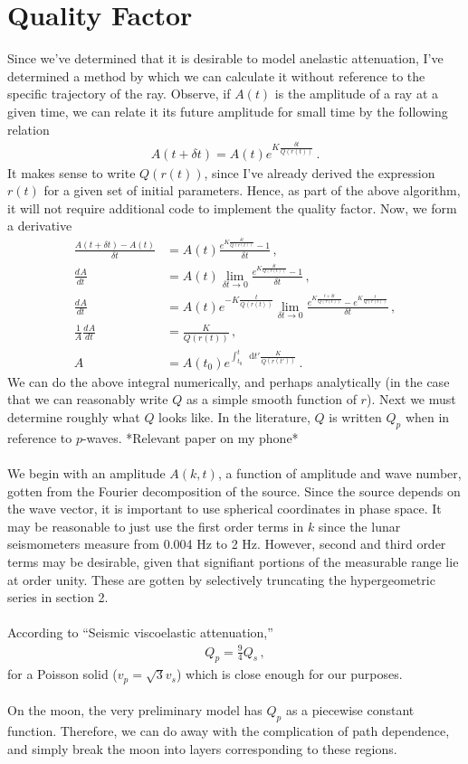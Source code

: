 \documentclass{article}
\newcommand*\diff{\mathop{}\!\mathrm{d}}
\newcommand*\f[2]{\frac{#1}{#2}}
\newcommand*\td[3]{\frac{d^{#3}#1}{d #2^{#3}}}
\begin{document}
\section{Quality Factor}
Since we've determined that it is desirable to model anelastic attenuation, I've determined a method by which we can calculate it without reference to the specific trajectory of the ray. Observe, if $A(t)$ is the amplitude of a ray at a given time, we can relate it its future amplitude for small time by the following relation
\begin{align}
A(t+\delta t) = A(t)e^{K\f{\delta t}{Q(r(t))}}\,.
\end{align}
It makes sense to write $Q(r(t))$, since I've already derived the expression $r(t)$ for a given set of initial parameters. Hence, as part of the above algorithm, it will not require additional code to implement the quality factor. Now, we form a derivative
\begin{align}
\f{A(t+\delta t)- A(t)}{\delta t} &= A(t)\f{e^{K\f{\delta t}{Q(r(t))}}-1}{\delta t}\,,\\
\td{A}{t}{}&= A(t)\lim_{\delta t\to 0}\f{e^{K\f{\delta t}{Q(r(t))}}-1}{\delta t}\,,\\
\td{A}{t}{}&= A(t)e^{-K\f{t}{Q(r(t))}}\lim_{\delta t\to 0}\f{e^{K\f{t +\delta t}{Q(r(t))}}-{e^{K\f{t}{Q(r(t))}}}}{\delta t}\,,\\
\f{1}{A}\td{A}{t}{}&= \f{K}{Q(r(t))}\,,\\
A &= A(t_0)e^{\int_{t_0}^t\diff t'\f{K}{Q(r(t'))}}\,.
\end{align}
We can do the above integral numerically, and perhaps analytically (in the case that we can reasonably write $Q$ as a simple smooth function of $r$). Next we must determine roughly what $Q$ looks like. In the literature, $Q$ is written $Q_p$ when in reference to $p$-waves. *Relevant paper on my phone*
\\\\
We begin with an amplitude $A(k,t)$, a function of amplitude and wave number, gotten from the Fourier decomposition of the source. Since the source depends on the wave vector, it is important to use spherical coordinates in phase space. It may be reasonable to just use the first order terms in $k$ since the lunar seismometers measure from  0.004 Hz to 2 Hz. However, second and third order terms may be desirable, given that signifiant portions of the measurable range lie at order unity. These are gotten by selectively truncating the hypergeometric series in section 2.
\\\\
According to ``Seismic viscoelastic attenuation,''
\begin{align}
Q_p = \f94 Q_s\,,
\end{align}
for a Poisson solid ($v_p =\sqrt3v_s$) which is close enough for our purposes.
\\\\
On the moon, the very preliminary model has $Q_p$ as a piecewise constant function. Therefore, we can do away with the complication of path dependence, and simply break the moon into layers corresponding to these regions.
\pagebreak
\end{document}

